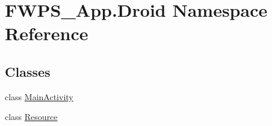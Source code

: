 \hypertarget{namespace_f_w_p_s___app_1_1_droid}{}\section{F\+W\+P\+S\+\_\+\+App.\+Droid Namespace Reference}
\label{namespace_f_w_p_s___app_1_1_droid}
\subsection*{Classes}
\begin{DoxyCompactItemize}
\item 
class \mbox{\hyperlink{class_f_w_p_s___app_1_1_droid_1_1_main_activity}{Main\+Activity}}
\item 
class \mbox{\hyperlink{class_f_w_p_s___app_1_1_droid_1_1_resource}{Resource}}
\end{DoxyCompactItemize}

